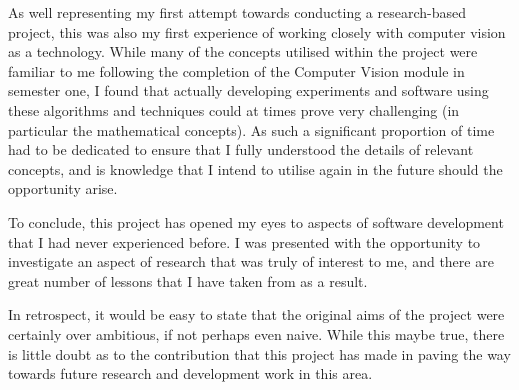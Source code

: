  As well representing my first attempt towards conducting a research-based project, this was also my first experience of working closely with computer vision as a technology. While many of the concepts utilised within the project were familiar to me following the completion of the Computer Vision module in semester one, I found that actually developing experiments and software using these algorithms and techniques could at times prove very challenging (in particular the mathematical concepts). As such a significant proportion of time had to be dedicated to ensure that I fully understood the details of relevant concepts, and is knowledge that I intend to utilise again in the future should the opportunity arise.
 
To conclude, this project has opened my eyes to aspects of software development that I had never experienced before. I was presented with the opportunity to investigate an aspect of research that was truly of interest to me, and there are great number of lessons that I have taken from as a result. 
 
In retrospect, it would be easy to state that the original aims of the project were certainly over ambitious, if not perhaps even naive. While this maybe true, there is little doubt as to the contribution that this project has made in paving the way towards future research and development work in this area.
 
 
  
 


